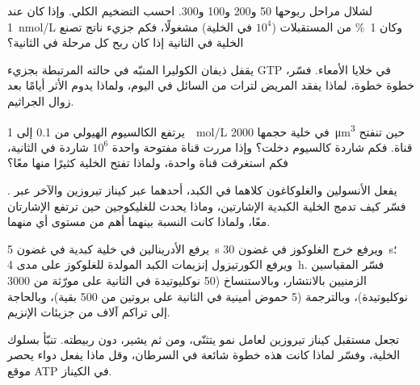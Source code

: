 \begin{exercise}[$\star\star$]\label{exo:b2:cell-signalling:6}
لشلال مراحل ربوحها 50 و200 و100 و300. احسب
التضخيم الكلي. وإذا كان  عند \qty{1}{nmol/L} وكان
\qty{1}{\%} من المستقبلات ($10^{4}$ في الخلية) مشغولًا، فكم
جزيء ناتج تصنع الخلية في الثانية إذا كان ربح كل مرحلة
في الثانية؟
\end{exercise}

\begin{exercise}[$\star\star$]\label{exo:b2:cell-signalling:7}
يقفل ذيفان الكوليرا  المنبّه في حالته المرتبطة
بجزيء GTP في خلايا الأمعاء. فسّر، خطوة خطوة، لماذا يفقد المريض
لترات من السائل في اليوم، ولماذا يدوم الأثر أيامًا بعد
زوال الجراثيم.
\end{exercise}

\begin{exercise}[$\star\star$]\label{exo:b2:cell-signalling:8}
يرتفع الكالسيوم الهيولي من \qty{0.1}{} إلى \qty{1}{\micro
mol/L} في خلية حجمها \qty{2000}{\micro m^3} حين تنفتح قناة. فكم
شاردة كالسيوم دخلت؟ وإذا مررت قناة مفتوحة واحدة $10^{6}$
شاردة في الثانية، فكم استغرقت قناة واحدة، ولماذا تفتح الخلية
كثيرًا منها معًا؟
\end{exercise}

\begin{exercise}[$\star\star$]\label{exo:b2:cell-signalling:9}
يفعل الأنسولين والغلوكاغون كلاهما في الكبد، أحدهما عبر كيناز
تيروزين والآخر عبر . فسّر كيف تدمج الخلية الكبدية
الإشارتين، وماذا يحدث للغليكوجين حين ترتفع الإشارتان معًا،
ولماذا كانت النسبة بينهما أهم من مستوى أي منهما.
\end{exercise}

\begin{exercise}[$\star\star\star$]\label{exo:b2:cell-signalling:10}
يرفع الأدرينالين  في خلية كبدية في غضون \qty{5}{s} ويرفع خرج
الغلوكوز في غضون \qty{30}{s}؛ ويرفع الكورتيزول إنزيمات الكبد المولدة
للغلوكوز على مدى \qty{4}{h}. فسّر المقياسين الزمنيين بالانتشار، وبالاستنساخ (\qty{50}{}
نوكليوتيدة في الثانية على مورّثة من \qty{3000}{} نوكليوتيدة)، وبالترجمة
(\qty{5}{} حموض أمينية في الثانية على بروتين من \num{500} بقية)، وبالحاجة
إلى تراكم آلاف من جزيئات الإنزيم.
\end{exercise}

\begin{exercise}[$\star\star\star$]\label{exo:b2:cell-signalling:11}
 تجعل مستقبل كيناز تيروزين لعامل نمو
يتثنّى، ومن ثم يشير، دون ربيطته. تنبّأ بسلوك
الخلية، وفسّر لماذا كانت هذه خطوة شائعة في السرطان، وقل
ماذا يفعل دواء يحصر موقع ATP في الكيناز.
\end{exercise}


